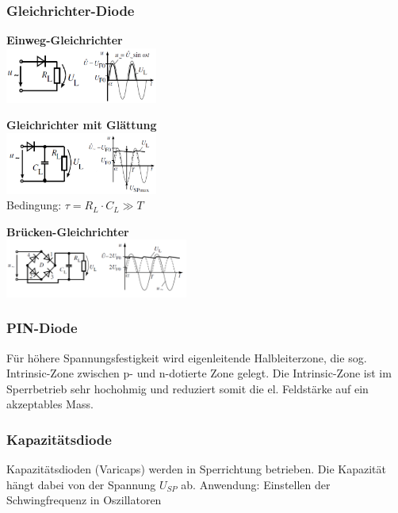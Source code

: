 		\subsubsection{Gleichrichter-Diode}
			\begin{minipage}[T]{6cm}
				\textbf{Einweg-Gleichrichter} \\
				\includegraphics[width=5cm]{./images/gleichrichter-einweg} \\
			\end{minipage}
			\begin{minipage}[T]{6cm}
				\textbf{Gleichrichter mit Glättung} \\
				\includegraphics[width=5cm]{./images/gleichrichter-einweg-glaettung} \\
				Bedingung: $\tau = R_L \cdot C_L \gg T$ \\
			\end{minipage}
			\begin{minipage}[T]{6cm}
				\textbf{Brücken-Gleichrichter} \\
				\includegraphics[width=6cm]{./images/gleichrichter-bruecke} \\
			\end{minipage}						

		\subsubsection{PIN-Diode}
			Für höhere Spannungsfestigkeit wird eigenleitende Halbleiterzone, die sog. 
			Intrinsic-Zone zwischen p- und n-dotierte Zone gelegt. Die Intrinsic-Zone
			ist im Sperrbetrieb sehr hochohmig und reduziert somit die el. Feldstärke
			auf ein akzeptables Mass.
		
		\subsubsection{Kapazitätsdiode}
			Kapazitätsdioden (Varicaps) werden in Sperrichtung betrieben. Die 
			Kapazität hängt dabei von der Spannung $U_{SP}$ ab.
			Anwendung: Einstellen der Schwingfrequenz in Oszillatoren \\
			
